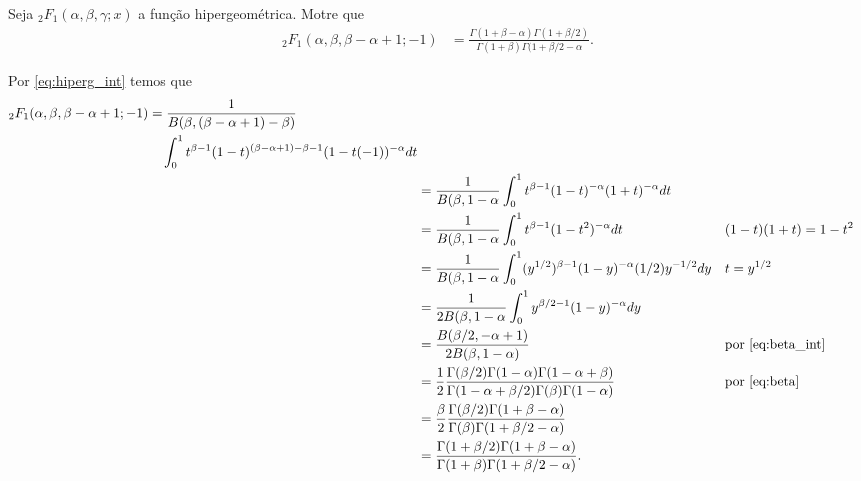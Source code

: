 \documentclass[a4paper,12pt, leqno, answers]{exam}
\begin{document}
\begin{questions}
    \question[P2 de 2011] Seja ${}_2F_1(\alpha, \beta, \gamma; x)$ a fun\c{c}\~{a}o hipergeom\'{e}trica. Motre que
    \begin{align*}
        {}_2F_1(\alpha, \beta, \beta - \alpha + 1; -1) &= \frac{\Gamma(1 + \beta - \alpha) \Gamma(1 + \beta/2)}{\Gamma(1 + \beta) \Gamma(1 + \beta/2 - \alpha}.
    \end{align*}
    \begin{solution}
        Por \eqref{eq:hiperg_int} temos que
        \begin{align*}
            \begin{split}
                {}_2F_1(\alpha, \beta, \beta - \alpha + 1; -1) &= \frac{1}{B(\beta, (\beta -\alpha + 1) - \beta)} \\ &\quad \int_0^1 t^{\beta - 1} (1 - t)^{(\beta - \alpha + 1) - \beta - 1} (1 - t(-1))^{-\alpha} dt \\
            \end{split} \\
            &= \frac{1}{B(\beta, 1 - \alpha} \int_0^1 t^{\beta - 1} (1 - t)^{-\alpha} (1 + t)^{-\alpha} dt \\
            &= \frac{1}{B(\beta, 1 - \alpha} \int_0^1 t^{\beta - 1} (1 - t^2)^{-\alpha} dt && (1 - t)(1 + t) = 1 - t^2 \\
            &= \frac{1}{B(\beta, 1 - \alpha} \int_0^1 (y^{1/2})^{\beta - 1} (1 - y)^{-\alpha} (1 / 2) y^{-1/2} dy && t = y^{1/2} \\
            &= \frac{1}{2 B(\beta, 1 - \alpha} \int_0^1 y^{\beta / 2 - 1} (1 - y)^{-\alpha} dy \\
            &= \frac{B(\beta / 2, -\alpha + 1)}{2 B(\beta, 1 - \alpha)} && \text{por \eqref{eq:beta_int}} \\
            &= \frac{1}{2} \frac{\Gamma(\beta/2) \Gamma(1 - \alpha) \Gamma(1 - \alpha + \beta)}{\Gamma(1 - \alpha + \beta/2) \Gamma(\beta) \Gamma(1 - \alpha)} && \text{por \eqref{eq:beta}} \\
            &= \frac{\beta}{2} \frac{\Gamma(\beta / 2) \Gamma(1 + \beta - \alpha)}{\Gamma(\beta) \Gamma(1 + \beta / 2 - \alpha)} \\
            &= \frac{\Gamma(1 + \beta / 2) \Gamma(1 + \beta - \alpha)}{\Gamma(1 + \beta) \Gamma(1 + \beta / 2 - \alpha)}.
        \end{align*}
    \end{solution}


\end{questions}
\end{document}
